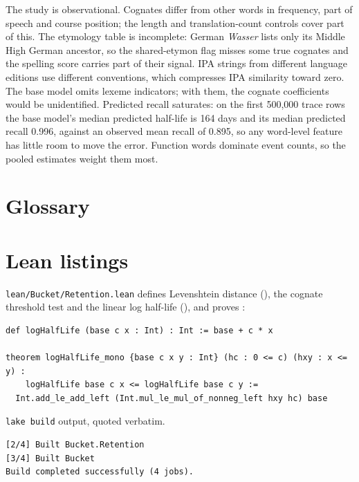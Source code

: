 \documentclass[11pt]{article}
\begin{document}
The study is observational. Cognates differ from other words in
frequency, part of speech and course position; the length and
translation-count controls cover part of this. The etymology table is incomplete: German \textit{Wasser}
lists only its Middle High German ancestor, so the shared-etymon flag
misses some true cognates and the spelling score carries part of their
signal. IPA strings from different language editions use different
conventions, which compresses IPA similarity toward zero. The base model
omits lexeme indicators; with them, the cognate coefficients would be
unidentified. Predicted recall saturates: on the first 500,000 trace rows the base
model's median predicted half-life is 164 days and its median predicted
recall 0.996, against an observed mean recall of 0.895, so any
word-level feature has little room to move the error. Function words dominate event counts, so the pooled
estimates weight them most.

\printbibliography

\appendix

\section{Glossary}
\label{app:glossary}


\section{Lean listings}
\label{app:lean}

\texttt{lean/Bucket/Retention.lean} defines Levenshtein distance
(), the cognate threshold test and the linear log
half-life (), and proves :

\begin{lstlisting}[style=bucketlean]
def logHalfLife (base c x : Int) : Int := base + c * x

theorem logHalfLife_mono {base c x y : Int} (hc : 0 <= c) (hxy : x <= y) :
    logHalfLife base c x <= logHalfLife base c y :=
  Int.add_le_add_left (Int.mul_le_mul_of_nonneg_left hxy hc) base
\end{lstlisting}

\texttt{lake build} output, quoted verbatim.
\begin{verbatim}
[2/4] Built Bucket.Retention
[3/4] Built Bucket
Build completed successfully (4 jobs).
\end{verbatim}
\end{document}
